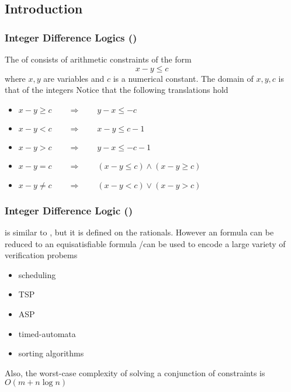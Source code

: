 \subsection{Introduction}

\begin{frame}
  \frametitle{Integer Difference Logics (\Idl)}

  The \tatoms of \Idl consists of arithmetic
  constraints of the form
  $$
  x - y \leq c
  $$
  where $x, y$ are variables and $c$ is a numerical constant.
  The domain of $x,y,c$ is that of the integers
  \vfill
  \pause
  Notice that the following translations hold
  \begin{itemize}
    \item $x - y \geq c  \quad\quad\Longrightarrow\quad\quad  y - x \leq -c$  
    \item $x - y < c     \quad\quad\Longrightarrow\quad\quad  x - y \leq  c-1$  
    \item $x - y > c     \quad\quad\Longrightarrow\quad\quad  y - x \leq -c-1$  
    \item $x - y = c     \quad\quad\Longrightarrow\quad\quad (x - y \leq c) \wedge (x - y \geq c)$  
    \item $x - y \not= c \quad\quad\Longrightarrow\quad\quad (x - y < c)    \vee   (x - y > c)$  
  \end{itemize}

\end{frame}

\begin{frame}
  \frametitle{Integer Difference Logic (\Idl)}
  
  \Rdl is similar to \Idl, but it is defined on the rationals. However
  an \Rdl formula can be reduced to an equisatisfiable \Idl formula 
  \vfill
  \pause 
  \Idl/\Rdl can be used to encode a large variety of verification probems
  \begin{itemize}
    \item scheduling
    \item TSP
    \item ASP
    \item timed-automata
    \item sorting algorithms
  \end{itemize}
  \vfill
  Also, the worst-case complexity of solving a conjunction of \Idl constraints is $O(m + n \log n)$

\end{frame}
